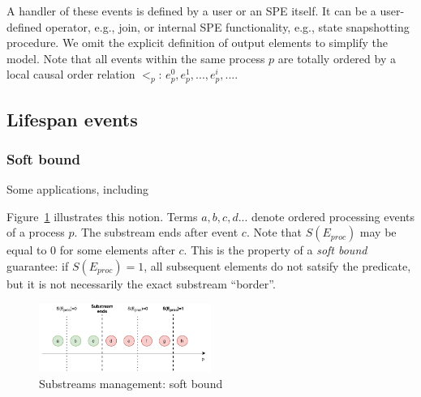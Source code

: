 A handler of these events is defined by a user or an SPE itself. It can be a user-defined operator, e.g., join, or internal SPE functionality, e.g., state snapshotting procedure. We omit the explicit definition of output elements to simplify the model. Note that all events within the same process $p$ are totally ordered by a local causal order relation $<_p$: $e^{0}_p,e^{1}_p,...,e^{i}_p,...$.

\subsection{Lifespan events}

\subsubsection{Soft bound}



Some applications, including 

Figure~\ref{general_guarantees} illustrates this notion. Terms $a,b,c,d...$ denote ordered processing events of a process $p$. The substream ends after event $c$. Note that $S(E_{proc})$ may be equal to $0$ for some elements after $c$. This is the property of a {\em soft bound} guarantee: if $S(E_{proc})=1$, all subsequent elements do not satsify the predicate, but it is not necessarily the exact substream ``border''.

\begin{figure}[htbp]
  \centering
  \includegraphics[width=0.50\textwidth]{pics/general-guarantee.pdf}
  \caption{Substreams management: soft bound}
  \label{general_guarantees}
\end{figure}

